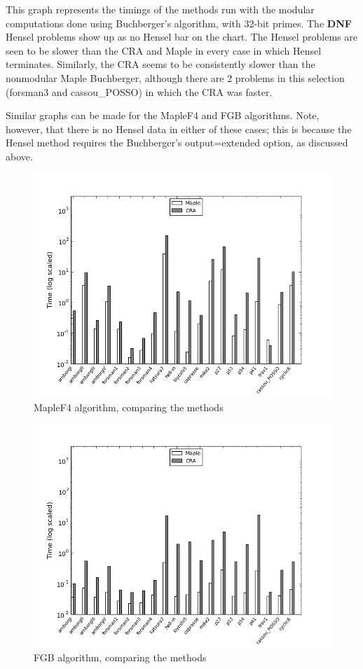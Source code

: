 \documentclass[letterpaper,12pt,titlepage,oneside,final]{book}
\begin{document}
This graph represents the timings of the methods run with the modular computations done using Buchberger's algorithm, with 32-bit primes.  The \textbf{DNF} Hensel problems show up as no Hensel bar on the chart.  The Hensel problems are seen to be slower than the CRA and Maple in every case in which Hensel terminates.  Similarly, the CRA seems to be consistently slower than the nonmodular Maple Buchberger, although there are 2 problems in this selection (forsman3 and cassou\_POSSO) in which the CRA was faster.

Similar graphs can be made for the MapleF4 and FGB algorithms.  Note, however, that there is no Hensel data in either of these cases; this is because the Hensel method requires the Buchberger's output=extended option, as discussed above.

\begin{figure}[H]
  \centering
  \includegraphics[scale=0.7]{f4_tests.png}
  \caption{MapleF4 algorithm, comparing the methods \label{fig:f4_tests}}
\end{figure}

\begin{figure}[H]
  \centering
  \includegraphics[scale=0.7]{fgb_tests.png}
  \caption{FGB algorithm, comparing the methods \label{fig:fgb_tests}}
\end{figure}
\end{document}
